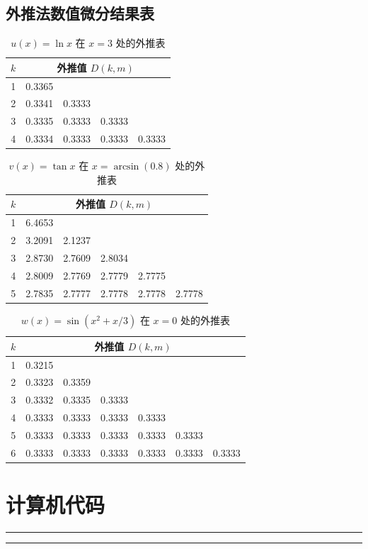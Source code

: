 \documentclass[12pt,a4paper]{article}
\begin{document}
\newpage

\subsection{外推法数值微分结果表}

\begin{table}[htbp]
\centering
\caption{\(u(x)=\ln x\) 在 \(x=3\) 处的外推表}
\label{tab:extrap1}
\begin{tabular}{c*{4}{c}}
\toprule
\(k\) & \multicolumn{4}{c}{外推值 \(D(k,m)\)} \\
\midrule
1 & 0.3365 & & & \\
2 & 0.3341 & 0.3333 & & \\
3 & 0.3335 & 0.3333 & 0.3333 & \\
4 & 0.3334 & 0.3333 & 0.3333 & 0.3333 \\
\bottomrule
\end{tabular}
\end{table}

\begin{table}[htbp]
\centering
\caption{\(v(x)=\tan x\) 在 \(x=\arcsin(0.8)\) 处的外推表}
\label{tab:extrap2}
\begin{tabular}{c*{5}{c}}
\toprule
\(k\) & \multicolumn{5}{c}{外推值 \(D(k,m)\)} \\
\midrule
1 & 6.4653 & & & & \\
2 & 3.2091 & 2.1237 & & & \\
3 & 2.8730 & 2.7609 & 2.8034 & & \\
4 & 2.8009 & 2.7769 & 2.7779 & 2.7775 & \\
5 & 2.7835 & 2.7777 & 2.7778 & 2.7778 & 2.7778 \\
\bottomrule
\end{tabular}
\end{table}

\begin{table}[htbp]
\centering
\caption{\(w(x)=\sin(x^2+x/3)\) 在 \(x=0\) 处的外推表}
\label{tab:extrap3}
\begin{tabular}{c*{6}{c}}
\toprule
\(k\) & \multicolumn{6}{c}{外推值 \(D(k,m)\)} \\
\midrule
1 & 0.3215 & & & & & \\
2 & 0.3323 & 0.3359 & & & & \\
3 & 0.3332 & 0.3335 & 0.3333 & & & \\
4 & 0.3333 & 0.3333 & 0.3333 & 0.3333 & & \\
5 & 0.3333 & 0.3333 & 0.3333 & 0.3333 & 0.3333 & \\
6 & 0.3333 & 0.3333 & 0.3333 & 0.3333 & 0.3333 & 0.3333 \\
\bottomrule
\end{tabular}
\end{table}

\newpage
\section{计算机代码}

\small
\hrule


\hrule
\end{document}
